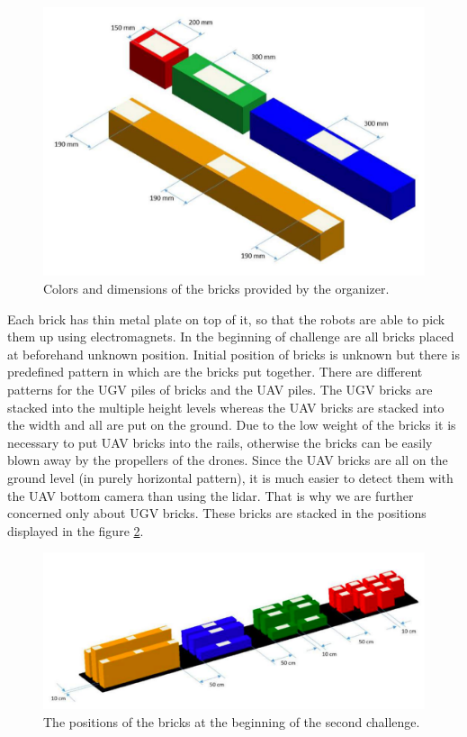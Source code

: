 \begin{figure}[H]

\centering
\includegraphics[scale=0.35]{fig/brick_sample.png}
\caption[Bricks definition]{Colors and dimensions of the bricks provided by the organizer.}
\label{fig:brickdef}

\end{figure}

Each brick has thin metal plate on top of it, so that the robots are able to pick them up using electromagnets. In the beginning of challenge are all bricks placed at beforehand unknown position. Initial position of bricks is unknown but there is predefined pattern in which are the bricks put together. There are different patterns for the UGV piles of bricks and the UAV piles. The UGV bricks are stacked into the multiple height levels whereas the UAV bricks are stacked into the width and all are put on the ground. Due to the low weight of the bricks it is necessary to put UAV bricks into the rails, otherwise the bricks can be easily blown away by the propellers of the drones. Since the UAV bricks are all on the ground level (in purely horizontal pattern), it is much easier to detect them with the UAV bottom camera than using the lidar. That is why we are further concerned only about UGV bricks. These bricks are stacked in the positions displayed in the figure \ref{fig:piledef}.

\begin{figure}[H]

\centering
\includegraphics[scale=0.35]{fig/initial_layout.png}
\caption[Initial brick layout]{The positions of the bricks at the beginning of the second challenge.}
\label{fig:piledef}

\end{figure}

